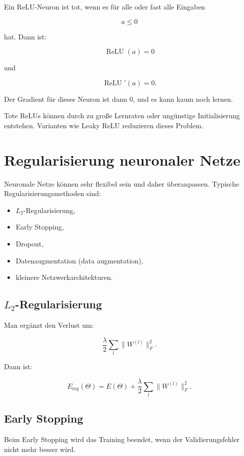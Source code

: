 Ein ReLU-Neuron ist tot, wenn es für alle oder fast alle Eingaben

\[
    a \leq 0
\]

hat.
Dann ist:

\[
    \operatorname{ReLU}(a)=0
\]

und

\[
    \operatorname{ReLU}'(a)=0.
\]

Der Gradient für dieses Neuron ist dann \(0\), und es kann kaum noch lernen.

\begin{notebox}
Tote ReLUs können durch zu große Lernraten oder ungünstige Initialisierung entstehen.
Varianten wie Leaky ReLU reduzieren dieses Problem.
\end{notebox}

\section{Regularisierung neuronaler Netze}

Neuronale Netze können sehr flexibel sein und daher überanpassen.
Typische Regularisierungsmethoden sind:

\begin{itemize}
    \item \(L_2\)-Regularisierung,
    \item Early Stopping,
    \item Dropout,
    \item Datenaugmentation (data augmentation),
    \item kleinere Netzwerkarchitekturen.
\end{itemize}

\subsection{\(L_2\)-Regularisierung}

Man ergänzt den Verlust um:

\[
    \frac{\lambda}{2}
    \sum_l
    \|W^{(l)}\|_F^2.
\]

Dann ist:

\[
    E_{\mathrm{reg}}(\Theta)
    =
    E(\Theta)
    +
    \frac{\lambda}{2}
    \sum_l
    \|W^{(l)}\|_F^2.
\]

\subsection{Early Stopping}

Beim Early Stopping wird das Training beendet, wenn der Validierungsfehler nicht mehr besser wird.


